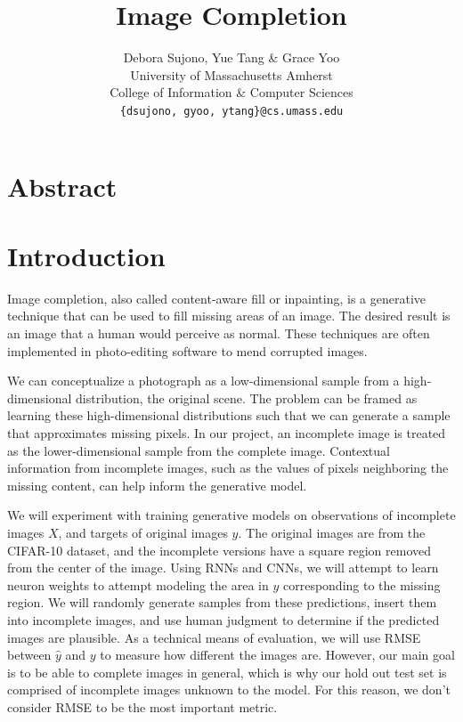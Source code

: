 \documentclass[10pt,twocolumn,letterpaper]{article}
\begin{document}
\title{Image Completion}

\author{Debora Sujono, Yue Tang \& Grace Yoo \\ 
University of Massachusetts Amherst \\ 
College of Information \& Computer Sciences \\
{\tt\small \{dsujono, gyoo, ytang\}@cs.umass.edu} \\
}

\maketitle

\section{Abstract} 


\section{Introduction}
Image completion, also called content-aware fill or inpainting, is a generative technique that can be used to fill missing areas of an image. The desired result is an image that a human would perceive as normal. These techniques are often implemented in photo-editing software to mend corrupted images.

\par We can conceptualize a photograph as a low-dimensional sample from a high-dimensional distribution, the original scene. The problem can be framed as learning these high-dimensional distributions such that we can generate a sample that approximates missing pixels. In our project, an incomplete image is treated as the lower-dimensional sample from the complete image. Contextual information from incomplete images, such as the values of pixels neighboring the missing content, can help inform the generative model. 

\par 
We will experiment with training generative models on observations of incomplete images $X$, and targets of original images $y$. The original images are from the CIFAR-10 dataset, and the incomplete versions have a square region removed from the center of the image. Using RNNs and CNNs, we will attempt to learn neuron weights to attempt modeling the area in $y$ corresponding to the missing region. We will randomly generate samples from these predictions, insert them into incomplete images, and use human judgment to determine if the predicted images are plausible. As a technical means of evaluation, we will use RMSE between $\hat y$ and $y$ to measure how different the images are. However, our main goal is to be able to complete images in general, which is why our hold out test set is comprised of incomplete images unknown to the model. For this reason, we don't consider RMSE to be the most important metric.
\end{document}
